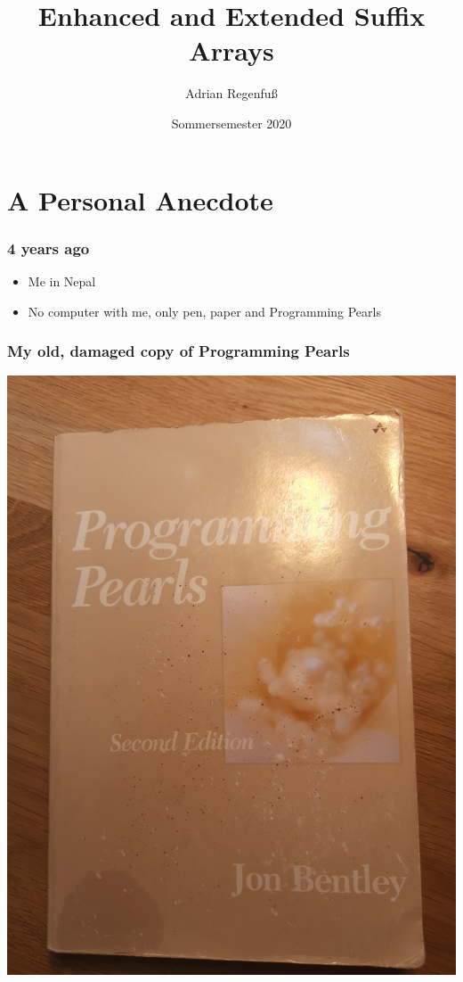 \documentclass[compress,handout]{beamer} %
\title[Enhanced and Extended Suffix Arrays]{Enhanced and Extended Suffix Arrays}
\author[A. Regenfuß]{Adrian Regenfuß}
\institute[TUM]{
  Technische Universität München
}
\date[SS'20]{Sommersemester 2020}
\begin{document}
\frame{\titlepage}


\section{A Personal Anecdote}

\begin{frame}
	\frametitle{4 years ago}
	\begin{itemize}
	\item Me in Nepal
	\item No computer with me, only pen, paper and Programming Pearls
	\end{itemize}
\end{frame}

\begin{frame}
	\frametitle{My old, damaged copy of Programming Pearls}
        \includegraphics[width=\textwidth, height=\textheight, keepaspectratio=true]{programming_pearls}
\end{frame}
\end{document}
